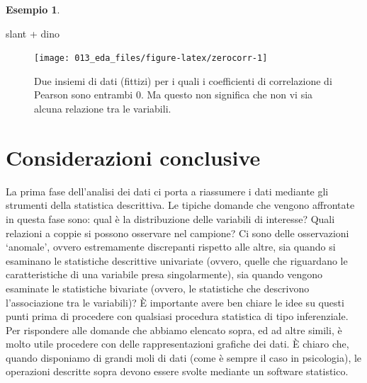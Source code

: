 \documentclass[
  11pt,
  italian,
  a4paper,
  extrafontsizes,onecolumn,openright
  ]{memoir}
\makeatletter
\newenvironment{Shaded}{\begin{snugshade}}{\end{snugshade}}
\newcommand{\NormalTok}[1]{#1}
\newcommand{\SpecialCharTok}[1]{\textcolor[rgb]{0.00,0.00,0.00}{#1}}
\newcommand{\MemoirChapStyle}{daleif1}
\newcommand{\MemoirPageStyle}{Ruled}
\newlength\widthw %
\newcommand*{\SmallMargins}{
  \setlrmarginsandblock{1.5in}{1.5in}{*}
  \setmarginnotes{0.1in}{0.1in}{0.1in}
 \setulmarginsandblock{1.5in}{1in}{*}
  \checkandfixthelayout
  \ch@ngetext
  \clearpage
  \setlength{\widthw}{\textwidth+\marginparsep+\marginparwidth}
  \footnotesatfoot
  \chapterstyle{\MemoirChapStyle}  %
  \pagestyle{\MemoirPageStyle}
}
\theoremstyle{definition}
\theoremstyle{definition}
\newtheorem{example}{Esempio}[chapter]
\theoremstyle{definition}
\theoremstyle{definition}
\theoremstyle{remark}
\makeatother
\begin{document}
\begin{example}
\begin{Shaded}
\begin{Highlighting}[]
\NormalTok{slant }\SpecialCharTok{+}\NormalTok{ dino}
\end{Highlighting}
\end{Shaded}

\begin{figure}[h]

{\centering \texttt{[image: 013\_eda\_files/figure-latex/zerocorr-1]} 

}

\caption{Due insiemi di dati (fittizi) per i quali i coefficienti di correlazione di Pearson sono entrambi 0. Ma questo non significa che non vi sia alcuna relazione tra le variabili.}\label{fig:zerocorr}
\end{figure}

\end{example}

\hypertarget{considerazioni-conclusive}{%
\section*{Considerazioni conclusive}\label{considerazioni-conclusive}}

La prima fase dell'analisi dei dati ci porta a riassumere i dati mediante gli strumenti della statistica descrittiva.
Le tipiche domande che vengono affrontate in questa fase sono: qual è la
distribuzione delle variabili di interesse? Quali relazioni a coppie si
possono osservare nel campione? Ci sono delle osservazioni `anomale',
ovvero estremamente discrepanti rispetto alle altre, sia quando si
esaminano le statistiche descrittive univariate (ovvero, quelle che
riguardano le caratteristiche di una variabile presa singolarmente), sia
quando vengono esaminate le statistiche bivariate (ovvero, le
statistiche che descrivono l'associazione tra le variabili)? È
importante avere ben chiare le idee su questi punti prima di procedere
con qualsiasi procedura statistica di tipo inferenziale. Per rispondere
alle domande che abbiamo elencato sopra, ed ad altre simili, è molto
utile procedere con delle rappresentazioni grafiche dei dati. È chiaro che, quando disponiamo di grandi moli di dati (come è sempre il caso in psicologia), le operazioni descritte sopra devono essere svolte mediante un software statistico.



\backmatter
\SmallMargins

\printbibliography
\onecolumn
\end{document}
